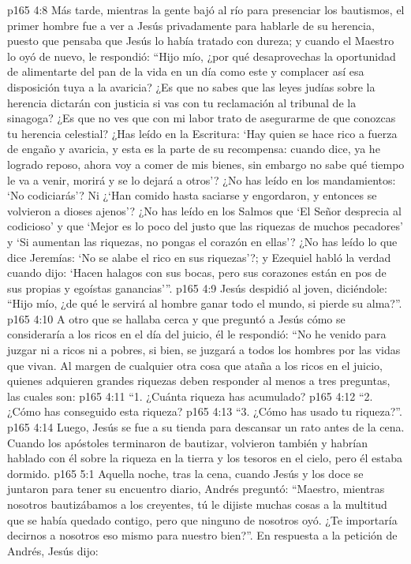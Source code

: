 \vs p165 4:8 \pc Más tarde, mientras la gente bajó al río para presenciar los bautismos, el primer hombre fue a ver a Jesús privadamente para hablarle de su herencia, puesto que pensaba que Jesús lo había tratado con dureza; y cuando el Maestro lo oyó de nuevo, le respondió: “Hijo mío, ¿por qué desaprovechas la oportunidad de alimentarte del pan de la vida en un día como este y complacer así esa disposición tuya a la avaricia? ¿Es que no sabes que las leyes judías sobre la herencia dictarán con justicia si vas con tu reclamación al tribunal de la sinagoga? ¿Es que no ves que con mi labor trato de asegurarme de que conozcas tu herencia celestial? ¿Has leído en la Escritura: ‘Hay quien se hace rico a fuerza de engaño y avaricia, y esta es la parte de su recompensa: cuando dice, ya he logrado reposo, ahora voy a comer de mis bienes, sin embargo no sabe qué tiempo le va a venir, morirá y se lo dejará a otros’? ¿No has leído en los mandamientos: ‘No codiciarás’? Ni ¿‘Han comido hasta saciarse y engordaron, y entonces se volvieron a dioses ajenos’? ¿No has leído en los Salmos que ‘El Señor desprecia al codicioso’ y que ‘Mejor es lo poco del justo que las riquezas de muchos pecadores’ y ‘Si aumentan las riquezas, no pongas el corazón en ellas’? ¿No has leído lo que dice Jeremías: ‘No se alabe el rico en sus riquezas’?; y Ezequiel habló la verdad cuando dijo: ‘Hacen halagos con sus bocas, pero sus corazones están en pos de sus propias y egoístas ganancias’”.
\vs p165 4:9 Jesús despidió al joven, diciéndole: “Hijo mío, ¿de qué le servirá al hombre ganar todo el mundo, si pierde su alma?”.
\vs p165 4:10 A otro que se hallaba cerca y que preguntó a Jesús cómo se consideraría a los ricos en el día del juicio, él le respondió: “No he venido para juzgar ni a ricos ni a pobres, si bien, se juzgará a todos los hombres por las vidas que vivan. Al margen de cualquier otra cosa que ataña a los ricos en el juicio, quienes adquieren grandes riquezas deben responder al menos a tres preguntas, las cuales son:
\vs p165 4:11 “1. ¿Cuánta riqueza has acumulado?
\vs p165 4:12 “2. ¿Cómo has conseguido esta riqueza?
\vs p165 4:13 “3. ¿Cómo has usado tu riqueza?”.
\vs p165 4:14 \pc Luego, Jesús se fue a su tienda para descansar un rato antes de la cena. Cuando los apóstoles terminaron de bautizar, volvieron también y habrían hablado con él sobre la riqueza en la tierra y los tesoros en el cielo, pero él estaba dormido.
\vs p165 5:1 Aquella noche, tras la cena, cuando Jesús y los doce se juntaron para tener su encuentro diario, Andrés preguntó: “Maestro, mientras nosotros bautizábamos a los creyentes, tú le dijiste muchas cosas a la multitud que se había quedado contigo, pero que ninguno de nosotros oyó. ¿Te importaría decirnos a nosotros eso mismo para nuestro bien?”. En respuesta a la petición de Andrés, Jesús dijo:
